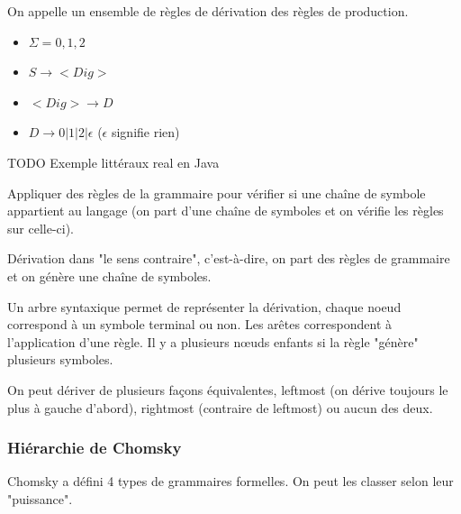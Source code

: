 \begin{mydef}
	On appelle un ensemble de règles de dérivation des règles de production.
\end{mydef}

\begin{myexem}
	\begin{itemize}
		\item $\Sigma ={0,1,2}$ 
		\item $S \rightarrow <Dig>$
		\item $<Dig> \rightarrow D$
		\item $D \rightarrow 0 | 1 |2 | \epsilon $ ($\epsilon$ signifie rien)
	\end{itemize}
\end{myexem}
TODO Exemple littéraux real en Java

\begin{mydef}[Dériver] Appliquer des règles de la grammaire pour vérifier 
	si une chaîne de symbole appartient au langage (on part d'une chaîne de symboles 
	et on vérifie les règles sur celle-ci).
\end{mydef}

\begin{mydef}[Inférer] Dérivation dans "le sens contraire", 
	c'est-à-dire, on part des règles de grammaire et on génère une chaîne 
	de symboles.
\end{mydef}

\begin{mydef}
	Un arbre syntaxique permet de représenter la dérivation, chaque noeud 
	correspond à un symbole terminal ou non. Les arêtes correspondent à 
	l'application d'une règle. Il y a plusieurs nœuds enfants si la règle 
	"génère" plusieurs symboles.
\end{mydef}

\begin{myprop}
	On peut dériver de plusieurs façons équivalentes, leftmost (on dérive 
	toujours le plus à gauche d'abord), rightmost (contraire de leftmost) 
	ou  aucun des deux.
\end{myprop}

\subsubsection{Hiérarchie de Chomsky}
\label{ssub:hi_rarchie_de_chomsky}

Chomsky a défini 4 types de grammaires formelles. On peut les classer selon 
leur "puissance".

